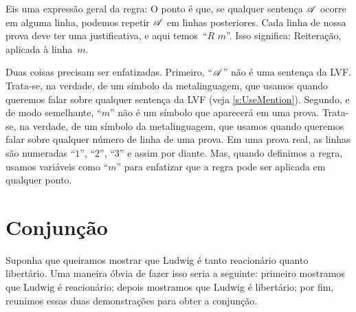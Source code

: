 Eis uma expressão geral da regra:
O ponto é que, se qualquer sentença $\mathscr{A}$ ocorre em alguma linha,
podemos repetir $\mathscr{A}$ em linhas posteriores. Cada linha de nossa prova
deve ter uma justificativa, e aqui temos~\textquotedblleft$R$ $m$\textquotedblright{}. Isso significa:
Reiteração, aplicada à linha~$m$.

Duas coisas precisam ser enfatizadas. Primeiro, \textquotedblleft$\mathscr{A}$\textquotedblright{} não é uma sentença da
LVF. Trata-se, na verdade, de um símbolo da metalinguagem, que usamos quando queremos falar sobre qualquer sentença da LVF (veja \cref{s:UseMention}).
Segundo, e de modo semelhante, \textquotedblleft$m$\textquotedblright{} não é um símbolo que aparecerá em uma
prova. Trata-se, na verdade, de um símbolo da metalinguagem, que usamos quando queremos falar sobre qualquer número de linha de uma prova. Em uma prova real,
as linhas são numeradas \textquotedblleft$1$\textquotedblright{}, \textquotedblleft$2$\textquotedblright{}, \textquotedblleft$3$\textquotedblright{} e assim por diante. Mas, quando
definimos a regra, usamos variáveis como \textquotedblleft$m$\textquotedblright{} para enfatizar que a regra pode ser aplicada em qualquer ponto.

\section{Conjunção}
Suponha que queiramos mostrar que Ludwig é tanto reacionário quanto libertário. Uma maneira óbvia de fazer isso seria a seguinte: primeiro mostramos que Ludwig é reacionário; depois mostramos que Ludwig é libertário; por fim, reunimos essas duas demonstrações para obter a conjunção.

